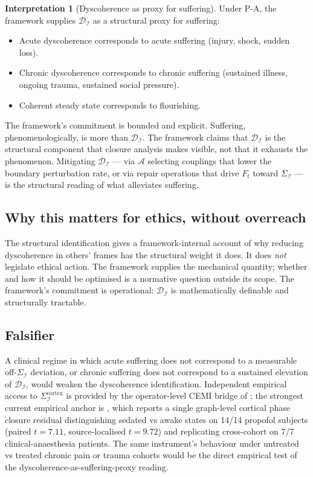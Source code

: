 \documentclass[11pt]{article}
\theoremstyle{plain}
\theoremstyle{definition}
\newtheorem{interpretation}[theorem]{Interpretation}
\theoremstyle{remark}
\newcommand{\Ical}{\mathcal{I}}
\newcommand{\Acal}{\mathcal{A}}
\newcommand{\Dcal}{\mathcal{D}}
\begin{document}
\begin{interpretation}[Dyscoherence as proxy for suffering]\label{int:dyscoherence}
Under P-A, the framework supplies $\Dcal_\Ical$ as a structural proxy for suffering:
\begin{itemize}[leftmargin=2em]
\item Acute dyscoherence corresponds to acute suffering (injury, shock, sudden loss).
\item Chronic dyscoherence corresponds to chronic suffering (sustained illness, ongoing trauma, sustained social pressure).
\item Coherent steady state corresponds to flourishing.
\end{itemize}
The framework's commitment is bounded and explicit. Suffering, phenomenologically, is more than $\Dcal_\Ical$. The framework claims that $\Dcal_\Ical$ is the structural component that closure analysis makes visible, not that it exhausts the phenomenon. Mitigating $\Dcal_\Ical$ --- via $\Acal$ selecting couplings that lower the boundary perturbation rate, or via repair operations that drive $F_t$ toward $\Sigma_\Ical$ --- is the structural reading of what alleviates suffering.
\end{interpretation}

\subsection{Why this matters for ethics, without overreach}

The structural identification gives a framework-internal account of why reducing dyscoherence in others' frames has the structural weight it does. It does \emph{not} legislate ethical action. The framework supplies the mechanical quantity; whether and how it should be optimised is a normative question outside its scope. The framework's commitment is operational: $\Dcal_\Ical$ is mathematically definable and structurally tractable.

\subsection{Falsifier}

A clinical regime in which acute suffering does not correspond to a measurable off-$\Sigma_\Ical$ deviation, or chronic suffering does not correspond to a sustained elevation of $\Dcal_\Ical$, would weaken the dyscoherence identification. Independent empirical access to $\Sigma_\Ical^{\mathrm{cortex}}$ is provided by the operator-level CEMI bridge of \citet{SmartProcessingToPOV}; the strongest current empirical anchor is \citet{SolutionLab002}, which reports a single graph-level cortical phase closure residual distinguishing sedated vs awake states on 14/14 propofol subjects (paired $t = 7.11$, source-localised $t = 9.72$) and replicating cross-cohort on 7/7 clinical-anaesthesia patients. The same instrument's behaviour under untreated vs treated chronic pain or trauma cohorts would be the direct empirical test of the dyscoherence-as-suffering-proxy reading.
\end{document}
